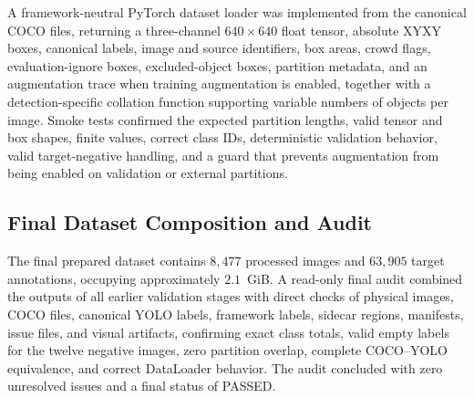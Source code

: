A framework-neutral PyTorch dataset loader was implemented from the canonical COCO files,
returning a three-channel $640\times640$ float tensor, absolute XYXY boxes, canonical
labels, image and source identifiers, box areas, crowd flags, evaluation-ignore boxes,
excluded-object boxes, partition metadata, and an augmentation trace when training
augmentation is enabled, together with a detection-specific collation function supporting
variable numbers of objects per image. Smoke tests confirmed the expected partition
lengths, valid tensor and box shapes, finite values, correct class IDs, deterministic
validation behavior, valid target-negative handling, and a guard that prevents augmentation
from being enabled on validation or external partitions.

\subsection{Final Dataset Composition and Audit}
\label{sec:methodology_audit}

The final prepared dataset contains $8{,}477$ processed images and $63{,}905$ target
annotations, occupying approximately $2.1$~GiB. A read-only final audit combined the
outputs of all earlier validation stages with direct checks of physical images, COCO files,
canonical YOLO labels, framework labels, sidecar regions, manifests, issue files, and
visual artifacts, confirming exact class totals, valid empty labels for the twelve negative
images, zero partition overlap, complete COCO--YOLO equivalence, and correct DataLoader
behavior. The audit concluded with zero unresolved issues and a final status of PASSED.
